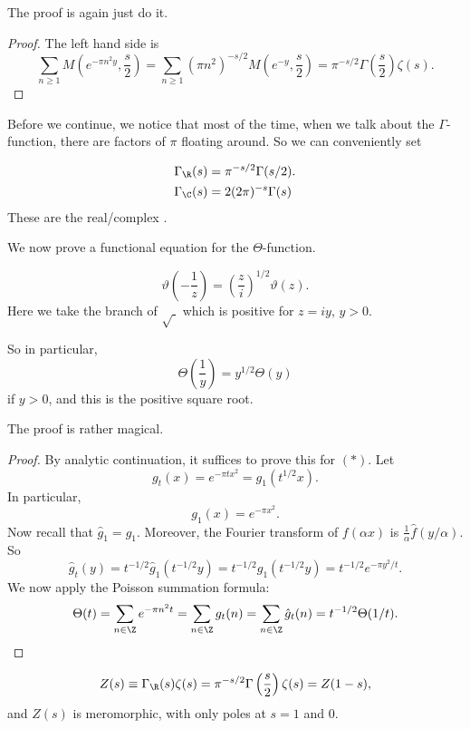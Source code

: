 \documentclass[a4paper]{article}
\begin{document}
The proof is again just do it.
\begin{proof}
  The left hand side is
  \[
    \sum_{n \geq 1} M\left(e^{-\pi n^2 y}, \frac{s}{2}\right) = \sum_{n \geq 1} (\pi n^2) ^{-s/2} M\left(e^{-y}, \frac{s}{2}\right) = \pi^{-s/2} \Gamma\left(\frac{s}{2}\right) \zeta(s).
  \]
\end{proof}

Before we continue, we notice that most of the time, when we talk about the $\Gamma$-function, there are factors of $\pi$ floating around. So we can conveniently set
\begin{notation}
  \begin{align*}
    \Gamma_\R(s) &= \pi^{-s/2} \Gamma(s/2).\\
    \Gamma_\C(s) &= 2 (2\pi)^{-s} \Gamma(s)
  \end{align*}
  These are the real/complex .
\end{notation}

We now prove a functional equation for the $\Theta$-function.

\begin{thm}
  \[
    \vartheta \left(-\frac{1}{z}\right) = \left(\frac{z}{i}\right)^{1/2} \vartheta(z).
  \]
  Here we take the branch of $\sqrt{\;}$ which is positive for $z = iy$, $y > 0$.

  So in particular,
  \[
    \Theta\left(\frac{1}{y}\right) = y^{1/2} \Theta(y)\tag{$*$}
  \]
  if $y > 0$, and this is the positive square root.
\end{thm}

The proof is rather magical.
\begin{proof}
  By analytic continuation, it suffices to prove this for $(*)$. Let
  \[
    g_t(x) = e^{-\pi t x^2} = g_1(t^{1/2} x).
  \]
  In particular,
  \[
    g_1(x) = e^{-\pi x^2}.
  \]
  Now recall that $\hat{g}_1 = g_1$. Moreover, the Fourier transform of $f(\alpha x)$ is $\frac{1}{\alpha} \hat{f}(y/\alpha)$. So
  \[
    \hat{g}_t(y) = t^{-1/2} \hat{g}_1(t^{-1/2} y) = t^{-1/2} g_1(t^{-1/2} y) = t^{-1/2} e^{-\pi y^2/t}.
  \]
  We now apply the Poisson summation formula:
  \[
    \Theta(t) = \sum_{n \in \Z} e^{-\pi n^2 t} = \sum_{n \in \Z} g_t(n) = \sum_{n \in \Z} \hat{g}_t(n) = t^{-1/2} \Theta(1/t).
  \]
\end{proof}

\begin{thm}
  \[
    Z(s) \equiv \Gamma_\R(s) \zeta(s) = \pi^{-s/2} \Gamma\left(\frac{s}{2}\right) \zeta(s) = Z(1 - s),
  \]
  and $Z(s)$ is meromorphic, with only poles at $s = 1$ and $0$.
\end{thm}
\end{document}
